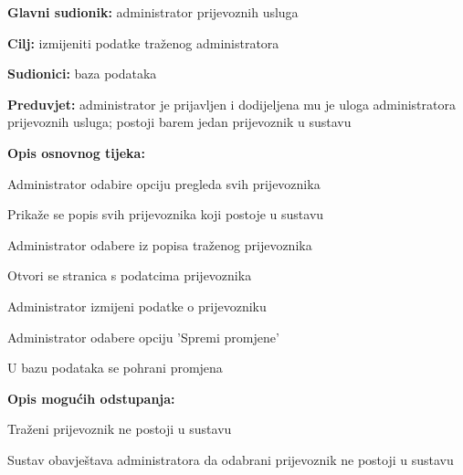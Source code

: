                         \noindent {}
					\begin{packed_item}
	
						\item \textbf{Glavni sudionik: }administrator prijevoznih usluga
						\item  \textbf{Cilj:} izmijeniti podatke traženog administratora
						\item  \textbf{Sudionici:} baza podataka
						\item  \textbf{Preduvjet:} administrator je prijavljen i dodijeljena mu je uloga administratora prijevoznih usluga; postoji barem jedan prijevoznik u sustavu
						\item  \textbf{Opis osnovnog tijeka:}
						
						\item[] \begin{packed_enum}
	
							\item Administrator odabire opciju pregleda svih prijevoznika
                                \item Prikaže se popis svih prijevoznika koji postoje u sustavu
                                \item Administrator odabere iz popisa traženog prijevoznika
                                \item Otvori se stranica s podatcima prijevoznika
                                \item Administrator izmijeni podatke o prijevozniku
                                \item Administrator odabere opciju 'Spremi promjene'
                                \item U bazu podataka se pohrani promjena
						\end{packed_enum}
						
						\item  \textbf{Opis mogućih odstupanja:}
						
						\item[] \begin{packed_item}
	
							\item[3.a] Traženi prijevoznik ne postoji u sustavu
							\item[] \begin{packed_enum}
								
								\item Sustav obavještava administratora da odabrani prijevoznik ne postoji u sustavu
								
							\end{packed_enum}
			
						\end{packed_item}
					\end{packed_item}

